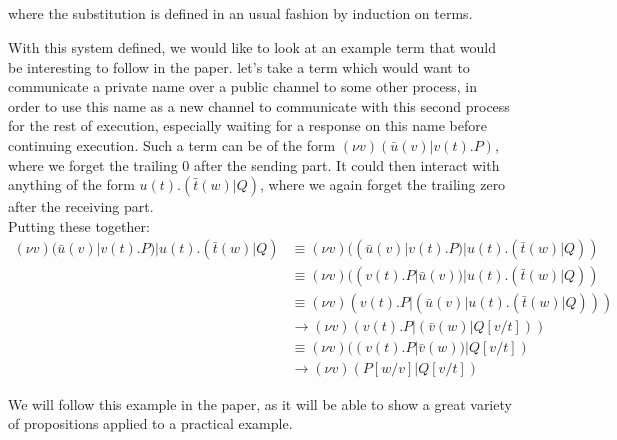 \begin{definition}
\begin{prooftree}\end{prooftree}\hfill~\\~\\
\begin{prooftree}\end{prooftree}\hfill
\begin{prooftree}\end{prooftree}\hfill
\begin{prooftree}\end{prooftree}\\~\\
where the substitution is defined in an usual fashion by induction on terms.
\end{definition}

With this system defined, we would like to look at an example term that would be interesting to follow in the paper.
\example let's take a term which would want to communicate a private name over a public channel to some other process, in order to use this name as a new channel to communicate with this second process for the rest of execution, especially waiting for a response on this name before continuing execution. Such a term can be of the form $(\nu v)(\bar{u}(v)|v(t).P)$, where we forget the trailing 0 after the sending part. It could then interact with anything of the form $u(t).(\bar{t}(w)|Q)$, where we again forget the trailing zero after the receiving part.\\
Putting these together:
\begin{align*}
(\nu v)(\bar{u}(v)|v(t).P)|u(t).(\bar{t}(w)|Q) &\equiv (\nu v)((\bar{u}(v)|v(t).P)|u(t).(\bar{t}(w)|Q))\\
&\equiv (\nu v)((v(t).P|\bar{u}(v))|u(t).(\bar{t}(w)|Q))\\
&\equiv (\nu v)(v(t).P|(\bar{u}(v)|u(t).(\bar{t}(w)|Q)))\\
&\to (\nu v)(v(t).P|(\bar{v}(w)|Q[v/t]))\\
&\equiv (\nu v)((v(t).P|\bar{v}(w))|Q[v/t])\\
&\to (\nu v)(P[w/v]|Q[v/t])
\end{align*}

We will follow this example in the paper, as it will be able to show a great variety of propositions applied to a practical example.

